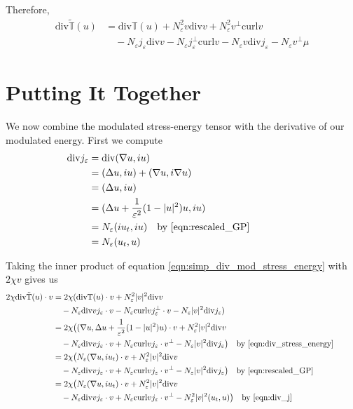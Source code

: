 \documentclass[a4paper]{article}
\renewcommand{\div}{\mathrm{div}}
\newcommand{\curl}{\mathrm{curl}}
\begin{document}
Therefore,
\begin{align}
  \div \tilde{\mathbb{T}}(u) &= \div \mathbb{T}(u) + N_\varepsilon^2 v \div v + N_\varepsilon^2 v^\perp \curl v \nonumber \\
  &\quad - N_\varepsilon j_\varepsilon \div v - N_\varepsilon j_\varepsilon^\perp \curl v - N_\varepsilon v \div j_\varepsilon - N_\varepsilon v^\perp \mu
  \label{eqn:simp_div_mod_stress_energy}
\end{align}

\section{Putting It Together}
We now combine the modulated stress-energy tensor with the derivative of our modulated energy.
First we compute
\begin{align}
  \div j_\varepsilon &= \div (\nabla u, iu) \nonumber \\
  &= ( \Delta u, iu ) + (\nabla u, i \nabla u) \nonumber \\
  &= ( \Delta u, iu ) \nonumber \\
  &= ( \Delta u + \frac{1}{\varepsilon^2} (1-|u|^2) u, iu ) \nonumber \\
  &= N_\varepsilon ( i u_t , iu ) \quad \parbox{5cm}{by \eqref{eqn:rescaled_GP}} \nonumber \\
  &= N_\varepsilon ( u_t, u )
  \label{eqn:div_j}
\end{align}

Taking the inner product of equation \eqref{eqn:simp_div_mod_stress_energy} with $2 \chi v$ gives us
\begin{align*}
  2 \chi \div \tilde{\mathbb{T}}(u) \cdot v &= 2 \chi ( \div \mathbb{T}(u) \cdot v + N_\varepsilon^2 |v|^2 \div v \nonumber \\
  &\quad - N_\varepsilon \div v j_\varepsilon \cdot v - N_\varepsilon \curl v j_\varepsilon^\perp \cdot v - N_\varepsilon |v|^2 \div j_\varepsilon )
  \nonumber \\
  &= 2 \chi \big( (\nabla u, \Delta u + \frac{1}{\varepsilon^2} (1-|u|^2)u) \cdot v + N_\varepsilon^2 |v|^2 \div v \nonumber \\
  &\quad - N_\varepsilon \div v j_\varepsilon \cdot v + N_\varepsilon \curl v j_\varepsilon \cdot v^\perp - N_\varepsilon |v|^2 \div j_\varepsilon
  \big) \quad \parbox{5cm}{by \eqref{eqn:div_stress_energy}} \nonumber \\
  &= 2 \chi \big( N_\varepsilon (\nabla u, i u_t) \cdot v + N_\varepsilon^2 |v|^2 \div v \nonumber \\
  &\quad - N_\varepsilon \div v j_\varepsilon \cdot v + N_\varepsilon \curl v j_\varepsilon \cdot v^\perp - N_\varepsilon |v|^2 \div j_\varepsilon
  \big) \quad \parbox{5cm}{by \eqref{eqn:rescaled_GP}} \nonumber \\
  &= 2 \chi \big( N_\varepsilon ( \nabla u, i u_t) \cdot v + N_\varepsilon^2 |v|^2 \div v \nonumber \\
  &\quad - N_\varepsilon \div v j_\varepsilon \cdot v + N_\varepsilon \curl v j_\varepsilon \cdot v^\perp - N_\varepsilon^2 |v|^2 (u_t, u) \big) \quad
  \parbox{5cm}{by \eqref{eqn:div_j}}
\end{align*}
\end{document}
